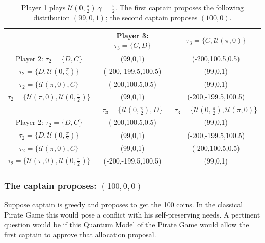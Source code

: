 \begin{center}
\begin{table}[h!]
\begin{centering}
\begin{tabular}{ccc}
\hline 
 & Player 3: $\tau_{3}=\{C,D\}$ &  $\tau_{3}=\{C,\mathcal{U}(\pi,0)\}$\tabularnewline
\hline 
Player 2: $\tau_{2}=\{D,C\}$ & (99,0,1) & (-200,100.5,0.5)\tabularnewline
$\tau_{2}=\{D,\mathcal{U}(0,\frac{\pi}{2})\}$ & (-200,-199.5,100.5) & (99,0,1)\tabularnewline
$\tau_{2}=\{\mathcal{U}(\pi,0),C\}$ & (-200,100.5,0.5) & (99,0,1)\tabularnewline
$\tau_{2}=\{\mathcal{U}(\pi,0),\mathcal{U}(0,\frac{\pi}{2})\}$ & (99,0,1) & (-200,-199.5,100.5)\tabularnewline
\hline 
\hline 
 & $\tau_{3}=\{\mathcal{U}(0,\frac{\pi}{2}),D\}$ & $\tau_{3}=\{\mathcal{U}(0,\frac{\pi}{2}),\mathcal{U}(\pi,0)\}$\tabularnewline
Player 2: $\tau_{2}=\{D,C\}$ & (-200,100.5,0.5) & (99,0,1)\tabularnewline
$\tau_{2}=\{D,\mathcal{U}(0,\frac{\pi}{2})\}$ & (99,0,1) & (-200,-199.5,100.5)\tabularnewline
$\tau_{2}=\{\mathcal{U}(\pi,0),C\}$ & (99,0,1) & (-200,100.5,0.5)\tabularnewline
$\tau_{2}=\{\mathcal{U}(\pi,0),\mathcal{U}(0,\frac{\pi}{2})\}$ & (-200,-199.5,100.5) & (99,0,1)\tabularnewline
\end{tabular}
\par\end{centering}

\caption{Player 1 plays $\mathcal{U}(0,\frac{\pi}{2})$.$\gamma=\frac{\pi}{2}$. The first captain proposes the following distribution $(99,0,1)$; the second captain proposes $(100,0)$. }
\label{livingontheedge}
\end{table}

\par\end{center}










\clearpage
\subsubsection{The captain proposes: $(100, 0, 0)$}
\label{subsubsec:3playergame100}

Suppose captain is greedy and proposes to get the 100 coins. In the classical Pirate Game this would pose a conflict with his self-preserving needs. 
A pertinent question would be if this Quantum Model of the Pirate Game would allow the first captain to approve that allocation proposal. 

